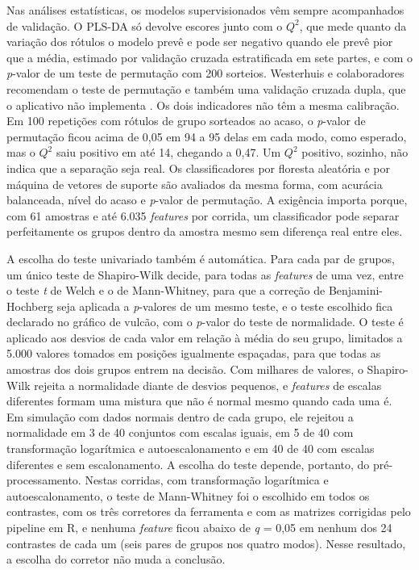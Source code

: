 Nas análises estatísticas, os modelos supervisionados vêm sempre acompanhados de validação. O PLS-DA só devolve escores junto com o \(Q^2\), que mede quanto da variação dos rótulos o modelo prevê e pode ser negativo quando ele prevê pior que a média, estimado por validação cruzada estratificada em sete partes, e com o \emph{p}-valor de um teste de permutação com 200 sorteios. Westerhuis e colaboradores recomendam o teste de permutação e também uma validação cruzada dupla, que o aplicativo não implementa \cite{westerhuis2008assessment}. Os dois indicadores não têm a mesma calibração. Em 100 repetições com rótulos de grupo sorteados ao acaso, o \emph{p}-valor de permutação ficou acima de 0,05 em 94 a 95 delas em cada modo, como esperado, mas o \(Q^2\) saiu positivo em até 14, chegando a 0,47. Um \(Q^2\) positivo, sozinho, não indica que a separação seja real. Os classificadores por floresta aleatória e por máquina de vetores de suporte são avaliados da mesma forma, com acurácia balanceada, nível do acaso e \emph{p}-valor de permutação. A exigência importa porque, com 61 amostras e até 6.035 \emph{features} por corrida, um classificador pode separar perfeitamente os grupos dentro da amostra mesmo sem diferença real entre eles.

A escolha do teste univariado também é automática. Para cada par de grupos, um único teste de Shapiro-Wilk \cite{shapiro1965analysis} decide, para todas as \emph{features} de uma vez, entre o teste \emph{t} de Welch e o de Mann-Whitney, para que a correção de Benjamini-Hochberg seja aplicada a \emph{p}-valores de um mesmo teste, e o teste escolhido fica declarado no gráfico de vulcão, com o \emph{p}-valor do teste de normalidade. O teste é aplicado aos desvios de cada valor em relação à média do seu grupo, limitados a 5.000 valores tomados em posições igualmente espaçadas, para que todas as amostras dos dois grupos entrem na decisão. Com milhares de valores, o Shapiro-Wilk rejeita a normalidade diante de desvios pequenos, e \emph{features} de escalas diferentes formam uma mistura que não é normal mesmo quando cada uma é. Em simulação com dados normais dentro de cada grupo, ele rejeitou a normalidade em 3 de 40 conjuntos com escalas iguais, em 5 de 40 com transformação logarítmica e autoescalonamento e em 40 de 40 com escalas diferentes e sem escalonamento. A escolha do teste depende, portanto, do pré-processamento. Nestas corridas, com transformação logarítmica e autoescalonamento, o teste de Mann-Whitney foi o escolhido em todos os contrastes, com os três corretores da ferramenta e com as matrizes corrigidas pelo pipeline em R, e nenhuma \emph{feature} ficou abaixo de \emph{q} = 0,05 em nenhum dos 24 contrastes de cada um (seis pares de grupos nos quatro modos). Nesse resultado, a escolha do corretor não muda a conclusão.
